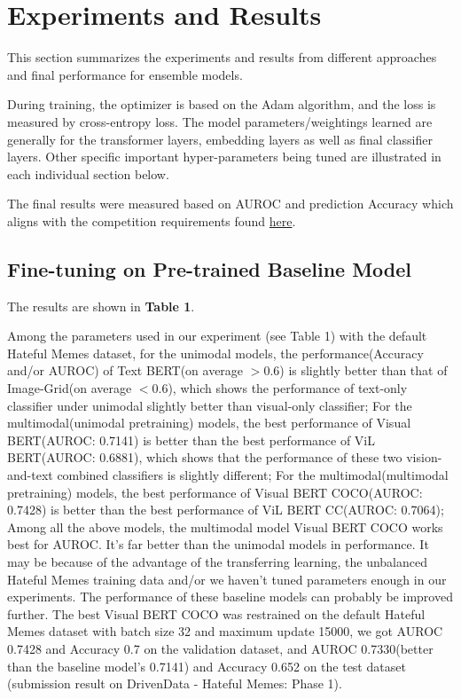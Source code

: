 \documentclass[10pt,twocolumn,letterpaper]{article}
\begin{document}
\section{Experiments and Results}
This section summarizes the experiments and results from different approaches and final performance for ensemble models.

During training, the optimizer is based on the Adam algorithm, and the loss is measured by cross-entropy loss. The model parameters/weightings learned are generally for the transformer layers, embedding layers as well as final classifier layers. Other specific important hyper-parameters being tuned are illustrated in each individual section below.

The final results were measured based on AUROC and prediction Accuracy which aligns with the competition requirements found \href{https://www.drivendata.org/competitions/64/hateful-memes/submissions/}{here}.

\subsection{Fine-tuning on Pre-trained Baseline Model}

The results are shown in \textbf{Table 1}. 

Among the parameters used in our experiment (see Table 1) with the default Hateful Memes dataset, for the unimodal models, the performance(Accuracy and/or AUROC) of Text BERT(on average $>$0.6) is slightly better than that of Image-Grid(on average $<$0.6), which shows the performance of text-only classifier under unimodal slightly better than visual-only classifier; For the multimodal(unimodal pretraining) models, the best performance of Visual BERT(AUROC: 0.7141) is better than the best performance of ViL BERT(AUROC: 0.6881), which shows that the performance of these two vision-and-text combined classifiers is slightly different; For the multimodal(multimodal pretraining) models,  the best performance of Visual BERT COCO(AUROC: 0.7428) is better than the best performance of ViL BERT CC(AUROC: 0.7064); Among all the above models, the multimodal model Visual BERT COCO works best for AUROC. It’s far better than the unimodal models in performance. It may be because of the advantage of the transferring learning, the unbalanced Hateful Memes training data and/or we haven’t tuned parameters enough in our experiments. The performance of these baseline models can probably be improved further. The best Visual BERT COCO was restrained on the default Hateful Memes dataset with batch size 32 and maximum update 15000, we got AUROC 0.7428 and Accuracy 0.7 on the validation dataset, and AUROC 0.7330(better than the baseline model's 0.7141) and Accuracy 0.652 on the test dataset (submission result on DrivenData - Hateful Memes: Phase 1).
\end{document}
